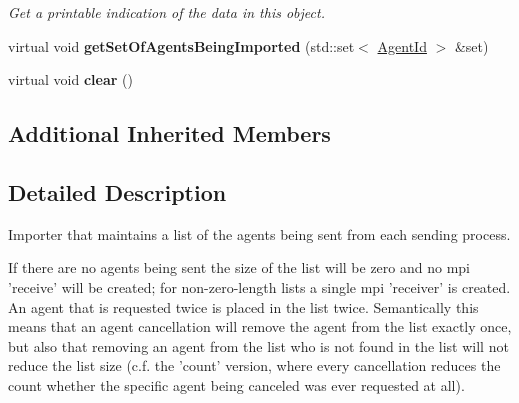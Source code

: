 \begin{DoxyCompactItemize}
\begin{DoxyCompactList}\small\item\em Get a printable indication of the data in this object. \end{DoxyCompactList}\item 
\hypertarget{classrepast_1_1_importer___l_i_s_t_a62df237c682e146ddfda6231058554e1}{virtual void {\bfseries get\-Set\-Of\-Agents\-Being\-Imported} (std\-::set$<$ \hyperlink{classrepast_1_1_agent_id}{Agent\-Id} $>$ \&set)}\label{classrepast_1_1_importer___l_i_s_t_a62df237c682e146ddfda6231058554e1}

\item 
\hypertarget{classrepast_1_1_importer___l_i_s_t_a3634bfc0d424dfe72ec886021a8f55d5}{virtual void {\bfseries clear} ()}\label{classrepast_1_1_importer___l_i_s_t_a3634bfc0d424dfe72ec886021a8f55d5}

\end{DoxyCompactItemize}
\subsection*{Additional Inherited Members}


\subsection{Detailed Description}
Importer that maintains a list of the agents being sent from each sending process. 

If there are no agents being sent the size of the list will be zero and no mpi 'receive' will be created; for non-\/zero-\/length lists a single mpi 'receiver' is created. An agent that is requested twice is placed in the list twice. Semantically this means that an agent cancellation will remove the agent from the list exactly once, but also that removing an agent from the list who is not found in the list will not reduce the list size (c.\-f. the 'count' version, where every cancellation reduces the count whether the specific agent being canceled was ever requested at all). 

